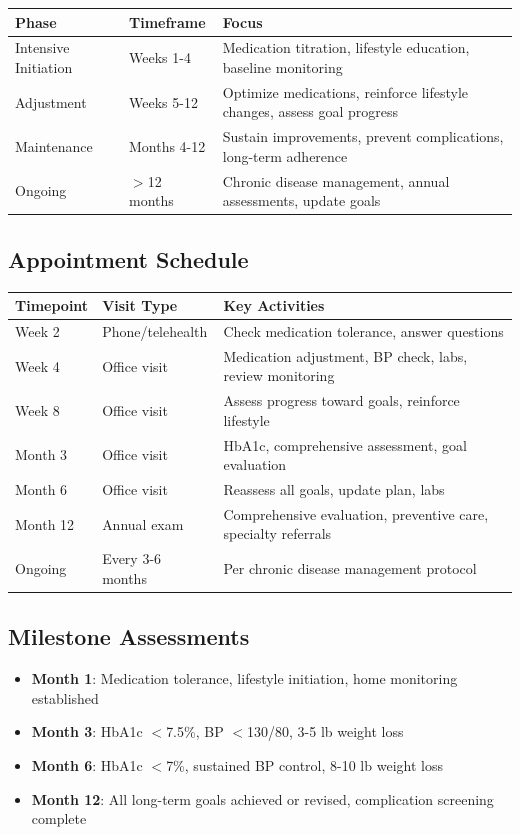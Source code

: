 \documentclass[11pt,letterpaper]{article}
\begin{document}
\begin{tabularx}{\textwidth}{|l|X|X|}
\hline
\textbf{Phase} & \textbf{Timeframe} & \textbf{Focus} \\ \hline
Intensive Initiation & Weeks 1-4 & Medication titration, lifestyle education, baseline monitoring \\ \hline
Adjustment & Weeks 5-12 & Optimize medications, reinforce lifestyle changes, assess goal progress \\ \hline
Maintenance & Months 4-12 & Sustain improvements, prevent complications, long-term adherence \\ \hline
Ongoing & $>$12 months & Chronic disease management, annual assessments, update goals \\ \hline
\end{tabularx}

\subsection*{Appointment Schedule}

\begin{tabularx}{\textwidth}{|l|X|X|}
\hline
\textbf{Timepoint} & \textbf{Visit Type} & \textbf{Key Activities} \\ \hline
Week 2 & Phone/telehealth & Check medication tolerance, answer questions \\ \hline
Week 4 & Office visit & Medication adjustment, BP check, labs, review monitoring \\ \hline
Week 8 & Office visit & Assess progress toward goals, reinforce lifestyle \\ \hline
Month 3 & Office visit & HbA1c, comprehensive assessment, goal evaluation \\ \hline
Month 6 & Office visit & Reassess all goals, update plan, labs \\ \hline
Month 12 & Annual exam & Comprehensive evaluation, preventive care, specialty referrals \\ \hline
Ongoing & Every 3-6 months & Per chronic disease management protocol \\ \hline
\end{tabularx}

\subsection*{Milestone Assessments}

\begin{itemize}[leftmargin=*]
    \item \textbf{Month 1}: Medication tolerance, lifestyle initiation, home monitoring established
    \item \textbf{Month 3}: HbA1c $<$7.5\%, BP $<$130/80, 3-5 lb weight loss
    \item \textbf{Month 6}: HbA1c $<$7\%, sustained BP control, 8-10 lb weight loss
    \item \textbf{Month 12}: All long-term goals achieved or revised, complication screening complete
\end{itemize}
\end{document}
